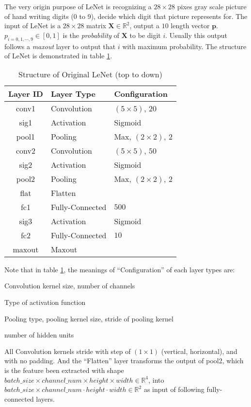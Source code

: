 The very origin purpose of LeNet is recognizing a $28 \times 28$ pixes gray scale picture of hand writing digits (0 to 9),
decide which digit that picture represents for. The input of LeNet is a $28 \times 28$ matrix $\mathbf{X} \in \mathbb{R}^2$,
output a $10$ length vector $\mathbf{p}$. $p_{i=0,1,\cdots,9} \in [0, 1]$ is the \textit{probability} of $\mathbf{X}$ to be
digit $i$. Usually this output follows a \textit{maxout} layer to output that $i$ with maximum probability.
The structure of LeNet is demonstrated in table \ref{tab::LeNet}.
\begin{table}[htb]
    \centering
    \begin{tabular}{cll}
        \toprule
        Layer ID & Layer Type & Configuration \\
        \midrule
        conv1 & Convolution & $\left(5\times5\right)$, $20$ \\
        sig1  & Activation  & Sigmoid \\
        pool1 & Pooling     & Max, $\left(2\times2\right)$, $2$ \\
        conv2 & Convolution & $\left(5\times5\right)$, $50$ \\
        sig2  & Activation  & Sigmoid \\
        pool2 & Pooling     & Max, $\left(2\times2\right)$, $2$ \\
        flat  & Flatten     & \\
        fc1   & Fully-Connected & $500$ \\
        sig3  & Activation  & Sigmoid \\
        fc2   & Fully-Connected & $10$ \\
        maxout & Maxout     & \\
        \bottomrule
    \end{tabular}
    \caption{Structure of Original LeNet (top to down)}
    \label{tab::LeNet}
\end{table}
Note that in table \ref{tab::LeNet}, the meanings of ``Configuration'' of each layer types are:
\begin{description}[labelsep=0.5em]
    \item[Convolution] Convolution kernel size, number of channels
    \item[Activation] Type of activation function
    \item[Pooling] Pooling type, pooling kernel size, stride of pooling kernel
    \item[Fully-Connected] number of hidden units
\end{description}
All Convolution kernels stride with step of $(1 \times 1)$ (vertical, horizontal),
and with no padding.
And the ``Flatten'' layer transforms the output of pool2, which is the feature been extracted
with shape $batch\_size \times channel\_num \times height \times width \in \mathbb{R}^4$, into
$batch\_size \times channel\_num \cdot height \cdot width \in \mathbb{R}^2$ as input of following
fully-connected layers.

